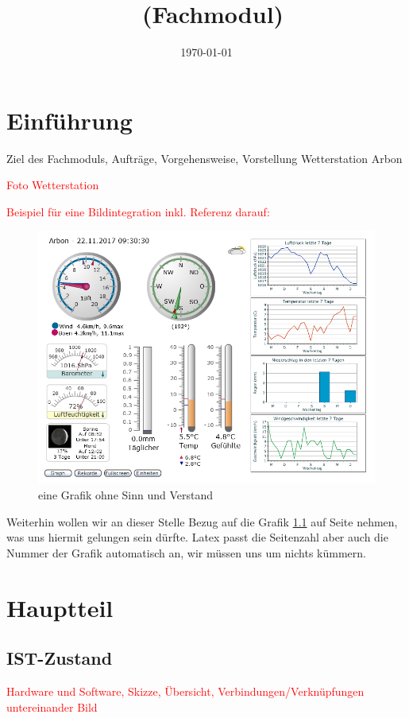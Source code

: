 \documentclass[a4paper,ngerman, 11pt]{report}
\title{\projektName~(Fachmodul)}
\author{\authorName}
\date{\today}
\newcommand\Diskussionspunkt[1]{\textcolor{red}{#1}}
\begin{document}

\setcounter{page}{2}
\tableofcontents          
\clearpage
{}


\chapter{Einführung}
Ziel des Fachmoduls, Aufträge, Vorgehensweise, Vorstellung Wetterstation Arbon

\Diskussionspunkt{Foto Wetterstation}


\Diskussionspunkt{Beispiel für eine Bildintegration inkl. Referenz darauf:}
\begin{figure}[htbp]
	\centering
	\includegraphics[width=0.9\linewidth]{img/grafik}
	\caption{eine Grafik ohne Sinn und Verstand}
	\label{img:grafik-dummy}
\end{figure}

Weiterhin wollen wir an dieser Stelle Bezug auf die Grafik
\ref{img:grafik-dummy} auf Seite \pageref{img:grafik-dummy} nehmen, was uns
hiermit gelungen sein dürfte. Latex passt die Seitenzahl aber auch die Nummer
der Grafik automatisch an, wir müssen uns um nichts kümmern.

\chapter{Hauptteil}

\section{IST-Zustand}
\Diskussionspunkt{Hardware und Software, 
Skizze, 
Übersicht, 
Verbindungen/Verknüpfungen untereinander}
\Diskussionspunkt{Bild}
\end{document}
